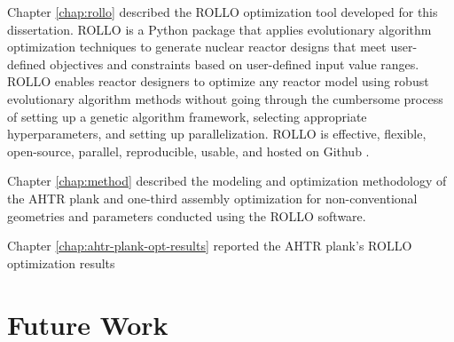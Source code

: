 Chapter \ref{chap:rollo} described the \gls{ROLLO} optimization tool developed for this 
dissertation. 
\gls{ROLLO} is a Python package that applies evolutionary algorithm 
optimization techniques to generate nuclear reactor designs that meet user-defined 
objectives and constraints based on user-defined input value ranges. 
\gls{ROLLO} enables reactor designers to optimize any reactor model using robust 
evolutionary algorithm methods without going through the cumbersome process of setting up 
a genetic algorithm framework, selecting appropriate hyperparameters, and setting up
parallelization.
\gls{ROLLO} is effective, flexible, open-source, parallel, reproducible, usable, and 
hosted on Github \cite{chee_rollo_2021}. 

Chapter \ref{chap:method} described the modeling and optimization methodology of the 
\gls{AHTR} plank and one-third assembly optimization for non-conventional 
geometries and parameters conducted using the \gls{ROLLO} software.


Chapter \ref{chap:ahtr-plank-opt-results} reported the \gls{AHTR} plank's 
\gls{ROLLO} optimization results



\section{Future Work}

